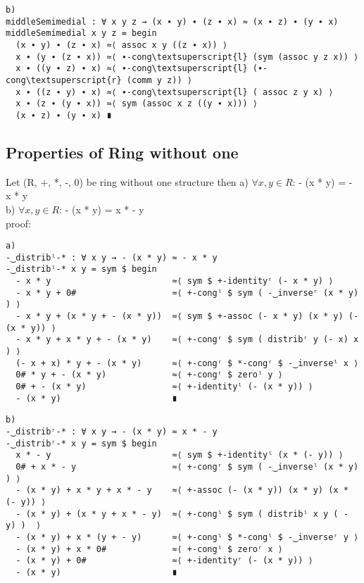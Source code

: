 \begin{Verbatim}[commandchars=\\\{\},samepage=true]
b)
middleSemimedial : ∀ x y z → (x ∙ y) ∙ (z ∙ x) ≈ (x ∙ z) ∙ (y ∙ x)
middleSemimedial x y z = begin
  (x ∙ y) ∙ (z ∙ x) ≈⟨ assoc x y ((z ∙ x)) ⟩
  x ∙ (y ∙ (z ∙ x)) ≈⟨ ∙-cong\textsuperscript{l} (sym (assoc y z x)) ⟩
  x ∙ ((y ∙ z) ∙ x) ≈⟨ ∙-cong\textsuperscript{l} (∙-cong\textsuperscript{r} (comm y z)) ⟩
  x ∙ ((z ∙ y) ∙ x) ≈⟨ ∙-cong\textsuperscript{l} ( assoc z y x) ⟩
  x ∙ (z ∙ (y ∙ x)) ≈⟨ sym (assoc x z ((y ∙ x))) ⟩
  (x ∙ z) ∙ (y ∙ x) ∎
\end{Verbatim}

\subsection{Properties of Ring without one}

Let (R, +, *, -, 0) be ring without one structure then
a) \(\forall x, y \in R\): - (x * y) = - x * y\\
b) \(\forall x, y \in R\): - (x * y) = x * - y\\
proof:
\begin{Verbatim}
a)
-‿distribˡ-* : ∀ x y → - (x * y) ≈ - x * y
-‿distribˡ-* x y = sym $ begin
  - x * y                        ≈⟨ sym $ +-identityʳ (- x * y) ⟩
  - x * y + 0#                   ≈⟨ +-congˡ $ sym ( -‿inverseʳ (x * y) ) ⟩
  - x * y + (x * y + - (x * y))  ≈⟨ sym $ +-assoc (- x * y) (x * y) (- (x * y)) ⟩
  - x * y + x * y + - (x * y)    ≈⟨ +-congʳ $ sym ( distribʳ y (- x) x ) ⟩
  (- x + x) * y + - (x * y)      ≈⟨ +-congʳ $ *-congʳ $ -‿inverseˡ x ⟩
  0# * y + - (x * y)             ≈⟨ +-congʳ $ zeroˡ y ⟩
  0# + - (x * y)                 ≈⟨ +-identityˡ (- (x * y)) ⟩
  - (x * y)                      ∎
\end{Verbatim}
\begin{Verbatim}
b)
-‿distribʳ-* : ∀ x y → - (x * y) ≈ x * - y
-‿distribʳ-* x y = sym $ begin
  x * - y                        ≈⟨ sym $ +-identityˡ (x * (- y)) ⟩
  0# + x * - y                   ≈⟨ +-congʳ $ sym ( -‿inverseˡ (x * y) ) ⟩
  - (x * y) + x * y + x * - y    ≈⟨ +-assoc (- (x * y)) (x * y) (x * (- y)) ⟩
  - (x * y) + (x * y + x * - y)  ≈⟨ +-congˡ $ sym ( distribˡ x y ( - y) )  ⟩
  - (x * y) + x * (y + - y)      ≈⟨ +-congˡ $ *-congˡ $ -‿inverseʳ y ⟩
  - (x * y) + x * 0#             ≈⟨ +-congˡ $ zeroʳ x ⟩
  - (x * y) + 0#                 ≈⟨ +-identityʳ (- (x * y)) ⟩
  - (x * y)                      ∎
\end{Verbatim}
